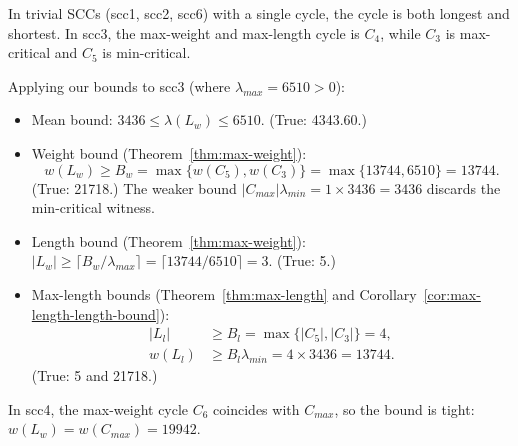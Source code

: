 \documentclass{article}
\theoremstyle{definition}
\begin{document}
In trivial SCCs (scc1, scc2, scc6) with a single cycle, the cycle is
both longest and shortest. In scc3, the max-weight and max-length
cycle is $C_4$, while $C_3$ is max-critical and $C_5$ is min-critical.

Applying our bounds to scc3 (where $\lambda_{max} = 6510 > 0$):
\begin{itemize}
\item Mean bound: $3436 \leq \lambda(L_w) \leq 6510$. (True: 4343.60.)
\item Weight bound (Theorem~\ref{thm:max-weight}):
  \begin{equation*}
    w(L_w) \geq B_w = \max\{w(C_5), w(C_3)\} = \max\{13744, 6510\} = 13744.
  \end{equation*}
  (True: 21718.) The weaker bound $|C_{max}|\lambda_{min} = 1 \times
  3436 = 3436$ discards the min-critical witness.
\item Length bound (Theorem~\ref{thm:max-weight}): $|L_w| \geq \lceil
  B_w/\lambda_{max} \rceil = \lceil 13744/6510 \rceil = 3$. (True: 5.)
\item Max-length bounds (Theorem~\ref{thm:max-length} and
  Corollary~\ref{cor:max-length-length-bound}):
  \begin{align*}
    |L_l| &\geq B_l = \max\{|C_5|, |C_3|\} = 4, \\
    w(L_l) &\geq B_l\lambda_{min} = 4 \times 3436 = 13744.
  \end{align*}
  (True: 5 and 21718.)
\end{itemize}

In scc4, the max-weight cycle $C_6$ coincides with $C_{max}$, so the
bound is tight: $w(L_w) = w(C_{max}) = 19942$.
\end{document}
